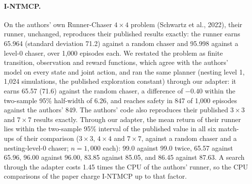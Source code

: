 \documentclass{article}
\begin{document}
\paragraph{I-NTMCP.} On the authors' own Runner-Chaser $4 \times 4$ problem (Schwartz et al., 2022), their runner, unchanged, reproduces their published results exactly: the runner earns 65.964 (standard deviation 71.2) against a random chaser and 95.998 against a level-0 chaser, over 1{,}000 episodes each. We restated the problem as finite transition, observation and reward functions, which agree with the authors' model on every state and joint action, and ran the same planner (nesting level 1, 1{,}024 simulations, the published exploration constant) through our adapter: it earns 65.57 (71.6) against the random chaser, a difference of $-0.40$ within the two-sample 95\% half-width of 6.26, and reaches safety in 847 of 1{,}000 episodes against the authors' 849. The authors' code also reproduces their published $3 \times 3$ and $7 \times 7$ results exactly. Through our adapter, the mean return of their runner lies within the two-sample 95\% interval of the published value in all six match-ups of their comparison ($3 \times 3$, $4 \times 4$ and $7 \times 7$, against a random chaser and a nesting-level-0 chaser; $n = 1{,}000$ each): 99.0 against 99.0 twice, 65.57 against 65.96, 96.00 against 96.00, 83.85 against 85.05, and 86.45 against 87.63. A search through the adapter costs 1.45 times the CPU of the authors' runner, so the CPU comparisons of the paper charge I-NTMCP up to that factor.
\end{document}
